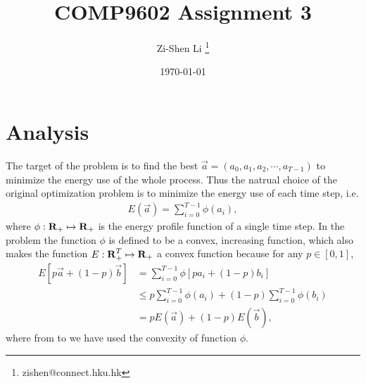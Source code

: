 \documentclass[letterpaper,11pt]{article}
\begin{document}
\title{COMP9602 Assignment 3}
\author[1]{Zi-Shen Li \thanks{zishen@connect.hku.hk}}
\date{\today}
\maketitle

\section{Analysis}\label{sec:analysis}

The target of the problem is to find the best $\vec a=(a_0,a_1,a_2,\cdots,a_{T-1})$ to minimize the energy use of the whole process.
Thus the natrual choice of the original optimization problem is to minimize the energy use of each time step, i.e.
\begin{align}
    E(\vec a)=\sum_{i=0}^{T-1} \phi(a_i),
\end{align}
where $\phi: \operatorname{\mathbf{R}}_+ \mapsto \operatorname{\mathbf{R}}_+$ is the energy profile function of a single time step.
In the problem the function $\phi$ is defined to be a convex, increasing function, which also makes the function $E: \operatorname{\mathbf{R}}_+^T \mapsto \operatorname{\mathbf{R}}_+$ a convex function because for any $p\in [0,1]$,
\begin{align}
    \label{eq:step1-cvxfunc}E\left[p\vec a+(1-p)\vec b\right] &= \sum_{i=0}^{T-1} \phi[p a_i+(1-p)b_i]\\
    \label{eq:step2-cvxfunc}&\le p\sum_{i=0}^{T-1} \phi(a_i)+(1-p)\sum_{i=0}^{T-1} \phi(b_i)\\
    &=p E(\vec a)+(1-p) E(\vec b),
\end{align}
where from  to  we have used the convexity of function $\phi$.
\end{document}
